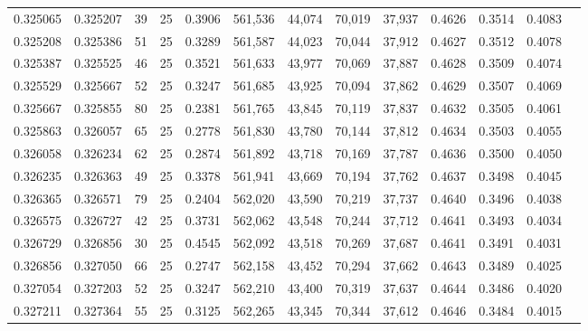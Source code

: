\begin{tabular}{rrrrrrrrrrrrr}
0.325065 & 0.325207 &    39 &  25 &                                     0.3906 & 561,536 &  44,074 &  70,019 &  37,937 & 0.4626 & 0.3514 & 0.4083 \\
0.325208 & 0.325386 &    51 &  25 &                                     0.3289 & 561,587 &  44,023 &  70,044 &  37,912 & 0.4627 & 0.3512 & 0.4078 \\
0.325387 & 0.325525 &    46 &  25 &                                     0.3521 & 561,633 &  43,977 &  70,069 &  37,887 & 0.4628 & 0.3509 & 0.4074 \\
0.325529 & 0.325667 &    52 &  25 &                                     0.3247 & 561,685 &  43,925 &  70,094 &  37,862 & 0.4629 & 0.3507 & 0.4069 \\
0.325667 & 0.325855 &    80 &  25 &                                     0.2381 & 561,765 &  43,845 &  70,119 &  37,837 & 0.4632 & 0.3505 & 0.4061 \\
0.325863 & 0.326057 &    65 &  25 &                                     0.2778 & 561,830 &  43,780 &  70,144 &  37,812 & 0.4634 & 0.3503 & 0.4055 \\
0.326058 & 0.326234 &    62 &  25 &                                     0.2874 & 561,892 &  43,718 &  70,169 &  37,787 & 0.4636 & 0.3500 & 0.4050 \\
0.326235 & 0.326363 &    49 &  25 &                                     0.3378 & 561,941 &  43,669 &  70,194 &  37,762 & 0.4637 & 0.3498 & 0.4045 \\
0.326365 & 0.326571 &    79 &  25 &                                     0.2404 & 562,020 &  43,590 &  70,219 &  37,737 & 0.4640 & 0.3496 & 0.4038 \\
0.326575 & 0.326727 &    42 &  25 &                                     0.3731 & 562,062 &  43,548 &  70,244 &  37,712 & 0.4641 & 0.3493 & 0.4034 \\
0.326729 & 0.326856 &    30 &  25 &                                     0.4545 & 562,092 &  43,518 &  70,269 &  37,687 & 0.4641 & 0.3491 & 0.4031 \\
0.326856 & 0.327050 &    66 &  25 &                                     0.2747 & 562,158 &  43,452 &  70,294 &  37,662 & 0.4643 & 0.3489 & 0.4025 \\
0.327054 & 0.327203 &    52 &  25 &                                     0.3247 & 562,210 &  43,400 &  70,319 &  37,637 & 0.4644 & 0.3486 & 0.4020 \\
0.327211 & 0.327364 &    55 &  25 &                                     0.3125 & 562,265 &  43,345 &  70,344 &  37,612 & 0.4646 & 0.3484 & 0.4015 \\

\end{tabular}
